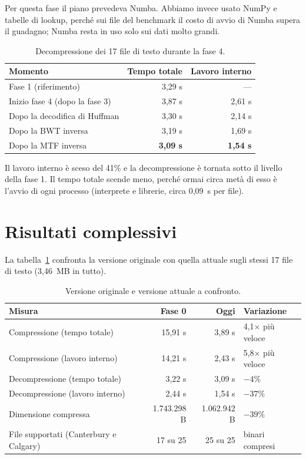 \documentclass[11pt,a4paper]{article}
\begin{document}
Per questa fase il piano prevedeva Numba. Abbiamo invece usato NumPy e tabelle di lookup,
perché sui file del benchmark il costo di avvio di Numba supera il guadagno; Numba resta in
uso solo sui dati molto grandi.

\begin{table}[h]
\centering
\begin{tabular}{lrr}
\toprule
Momento & Tempo totale & Lavoro interno \\
\midrule
Fase 1 (riferimento)          & 3,29 s & --- \\
Inizio fase 4 (dopo la fase 3)& 3,87 s & 2,61 s \\
Dopo la decodifica di Huffman & 3,30 s & 2,14 s \\
Dopo la BWT inversa           & 3,19 s & 1,69 s \\
Dopo la MTF inversa           & \textbf{3,09 s} & \textbf{1,54 s} \\
\bottomrule
\end{tabular}
\caption{Decompressione dei 17 file di testo durante la fase 4.}
\end{table}

Il lavoro interno è sceso del 41\% e la decompressione è tornata sotto il livello della
fase 1. Il tempo totale scende meno, perché ormai circa metà di esso è l'avvio di ogni
processo (interprete e librerie, circa 0,09~s per file).

\section{Risultati complessivi}

La tabella~\ref{tab:complessivo} confronta la versione originale con quella attuale sugli
stessi 17 file di testo (3,46~MB in tutto).

\begin{table}[h]
\centering
\begin{tabular}{lrrl}
\toprule
Misura & Fase 0 & Oggi & Variazione \\
\midrule
Compressione (tempo totale)      & 15,91 s & 3,89 s & 4,1$\times$ più veloce \\
Compressione (lavoro interno)    & 14,21 s & 2,43 s & 5,8$\times$ più veloce \\
Decompressione (tempo totale)    & 3,22 s  & 3,09 s & $-4\%$ \\
Decompressione (lavoro interno)  & 2,44 s  & 1,54 s & $-37\%$ \\
Dimensione compressa             & 1.743.298 B & 1.062.942 B & $-39\%$ \\
File supportati (Canterbury e Calgary) & 17 su 25 & 25 su 25 & binari compresi \\
\bottomrule
\end{tabular}
\caption{Versione originale e versione attuale a confronto.}
\label{tab:complessivo}
\end{table}
\end{document}
